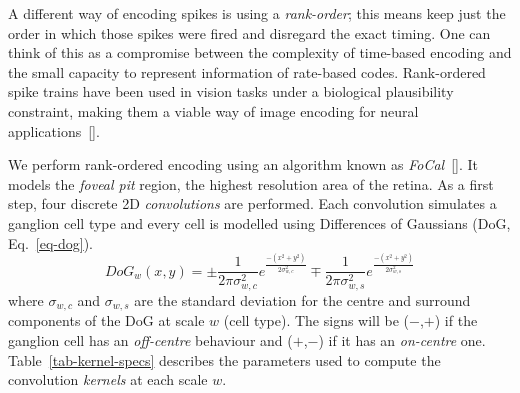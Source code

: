 A different way of encoding spikes is using a \emph{rank-order}; this means
keep just the order in which those spikes were fired and disregard the exact timing. One can think of this as a compromise between the complexity of time-based encoding and the small capacity to represent information of rate-based codes. Rank-ordered spike trains have been used in vision tasks under a biological plausibility constraint, making them a viable way of image encoding for neural applications~[\cite{van-rullen-rate-coding,basab-model}].

We perform rank-ordered encoding using an algorithm known as 
\emph{FoCal}~[\cite{basab-model}]. It models the \emph{foveal pit} region, the highest resolution area of the retina. As a first step, four discrete 2D \emph{convolutions} are performed. Each convolution simulates a ganglion cell type and every cell is modelled using Differences of Gaussians (DoG, Eq.~\ref{eq-dog}). 
\begin{equation}
\label{eq-dog}
DoG_w(x,y) = \pm\frac{1}{2\pi\sigma_{w,c}^2}e^{\frac{-(x^2 + y^2)}{2\sigma_{w,c}^2}}
\mp\frac{1}{2\pi\sigma_{w,s}^2}e^{\frac{-(x^2 + y^2)}{2\sigma_{w,s}^2}}
\end{equation}
where $\sigma_{w,c}$ and $\sigma_{w,s}$ are the standard deviation for the 
centre and surround components of the DoG at scale $w$ (cell type). The signs 
will be ($-$,$+$) if the ganglion cell has an \emph{off-centre} behaviour and 
($+$,$-$) if it has an \emph{on-centre} one. Table~\ref{tab-kernel-specs} 
describes the parameters used to compute the convolution \emph{kernels} at each 
scale $w$.

